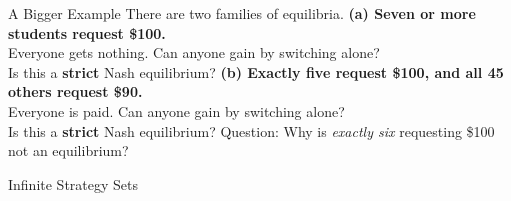 \begin{frame}{A Bigger Example}
There are two families of equilibria.
\bsk
\textbf{(a) Seven or more students request \$100.}\\
Everyone gets nothing. Can anyone gain by switching alone?\\
Is this a \textbf{strict} Nash equilibrium?\vspace{0.4in}
\bsk
\textbf{(b) Exactly five request \$100, and all 45 others request \$90.}\\
Everyone is paid. Can anyone gain by switching alone?\\
Is this a \textbf{strict} Nash equilibrium?\vspace{0.4in}
\bsk
{\footnotesize Question: Why is \textit{exactly six} requesting \$100 not an equilibrium?}
\end{frame}


\begin{frame}[standout]
Infinite Strategy Sets
\end{frame}



